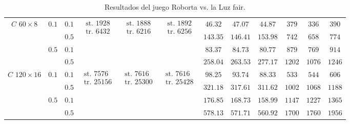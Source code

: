 \begin{table}[tp]
{\begin{tabular}{c|c|c|c|c|c|c|c|c|c|c|c}
       &  & $0.1$ &  &   &   & $46.32$ & $47.07$ & $44.87$ & $379$ & $336$ & $390$ \\ \hhline{|~|~|-|~|~|~|-|-|-|-|-|-|}
       & & $0.5$ & & & & $143.35$ & $146.41$ & $153.98$ & $742$ & $658$ & $774$ \\ \hhline{|~|-|-|~|~|~|-|-|-|-|-|-|}
       &  & $0.1$ & & & & $83.37$ & $84.73$ & $80.77$ & $879$ & $769$ & $914$ \\ \hhline{|~|~|-|~|~|~|-|-|-|-|-|-|}
       & & $0.5$ & & & & $258.04$ & $263.53$ & $277.17$ & $1202$ & $1076$ & $1246$ \\ \hline

       &  & $0.1$ &  &   &   & $98.25$ & $93.74$ & $88.33$ & $533$ & $544$ & $606$ \\ \hhline{|~|~|-|~|~|~|-|-|-|-|-|-|}
       & & $0.5$ & & & & $321.18$ & $317.61$ & $311.62$ & $1002$ & $1068$ & $1188$ \\ \hhline{|~|-|-|~|~|~|-|-|-|-|-|-|}
       &  & $0.1$ & & & & $176.85$ & $168.73$ & $158.99$ & $1147$ & $1227$ & $1365$\\ \hhline{|~|~|-|~|~|~|-|-|-|-|-|-|}
       & & $0.5$ & & & & $578.13$ & $571.71$ & $560.92$ & $1700$ & $1760$ & $1956$ \\ 

      \hline
    \end{tabular}
  }
  \caption{Resultados del juego Roborta vs. la Luz fair.}
  \label{table:resultsRobot}
\end{table}


